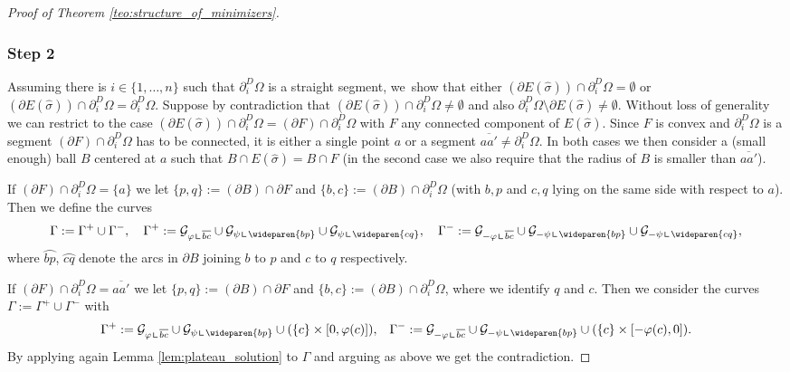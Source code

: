 \documentclass[JEP,XML,SOM,Unicode, NoFloatCountersInSection,published]{cedram}
\let\arc\wideparen
\let\Om\Omega
\newcommand{\resa}{\mathop{\hbox{\vrule height 7pt width 0.5pt depth 0pt
\vrule height 0.5pt width 6pt depth 0pt}}\nolimits}
\newcommand{\resb}{\mathop{\hbox{\vrule height 4pt width 0.5pt depth 0pt
\vrule height 0.5pt width 3pt depth 0pt}}\nolimits}
\newcommand{\res}{\mathchoice{\resa}{\resa}{\resb}{\resb}}
\theoremstyle{definition}
\begin{document}
\begin{proof}[Proof of Theorem \ref{teo:structure_of_minimizers}]
\subsubsection*{Step  2} Assuming there is $i\in\{1,\dots,n\}$ such that $\partial_i^D\Om$ is a straight segment, we~show that either $(\partial E(\widehat\sigma))\cap\partial_i^D\Om=\emptyset$ or $(\partial E(\widehat\sigma))\cap\partial_i^D\Om=\partial_i^D\Om$.
Suppose by contradiction that $(\partial E(\widehat\sigma))\cap\partial_i^D\Om\ne\emptyset$ and also $\partial_i^D\Om\setminus \partial E(\widehat\sigma)\neq \emptyset$. Without loss of generality we can restrict to the case $(\partial E(\widehat\sigma))\cap\partial_i^D\Om=(\partial F)\cap\partial_i^D\Om$ with $F$ any connected component of $E(\widehat\sigma)$. Since $F$ is convex and $\partial_i^D\Om$ is a segment $(\partial F)\cap\partial_i^D\Om$ has to be connected, \ie it is either a single point $a$ or a segment $\overline{aa'}\neq \partial_i^D\Om$.
In both cases we then consider a (small enough) ball $B$ centered at $a$ such that $B\cap E(\widehat\sigma)=B\cap F$ (in the second case we also require that the radius of $B$ is smaller than $\overline{aa'}$).

If $(\partial F)\cap\partial_i^D\Om=\{a\}$ we let $\{p,q\}:=(\partial B)\cap\partial F$ and $\{b,c\}:=(\partial B)\cap\partial_i^D\Om$ (with $b,p$ and $c,q$ lying on the same side with respect to $a$). Then
we define the curves
\begin{equation*}
\Gamma:=\Gamma^+\cup\Gamma^-,\quad \Gamma^+:=\mathcal{G}_{\varphi\res\overline{bc}}\cup \mathcal{G}_{\psi\res\arc{bp}} \cup \mathcal{G}_{\psi\res\arc{cq}},\quad \Gamma^-:=\mathcal{G}_{-\varphi\res\overline{bc}}\cup \mathcal{G}_{-\psi\res\arc{bp}}
\cup \mathcal{G}_{-\psi\res\arc{cq}},
\end{equation*}
where $\arc{bp}$, $\arc{cq}$ denote the arcs in $\partial B$ joining $b$ to $p$ and $c$ to $q$ respectively.

If $(\partial F)\cap\partial_i^D\Om=\overline{aa'}$ we let $\{p,q\}:=(\partial B)\cap\partial F$ and $\{b,c\}:=(\partial B)\cap\partial_i^D\Om$, where we identify $q$ and $c$. Then we consider the curves $\Gamma:=\Gamma^+\cup\Gamma^-$ with
\begin{equation*}
\Gamma^+:=\mathcal{G}_{\varphi\res\overline{bc}}\cup \mathcal{G}_{\psi\res\arc{bp}} \cup (\{c\}\times[0,\varphi(c)]),\quad\! \Gamma^-:=\mathcal{G}_{-\varphi\res\overline{bc}}\cup \mathcal{G}_{-\psi\res\arc{bp}}
\cup (\{c\}\times[-\varphi(c),0]).
\end{equation*}
By applying again Lemma \ref{lem:plateau_solution} to $\Gamma$ and arguing as above we get the contradiction.


\end{proof}
\end{document}
